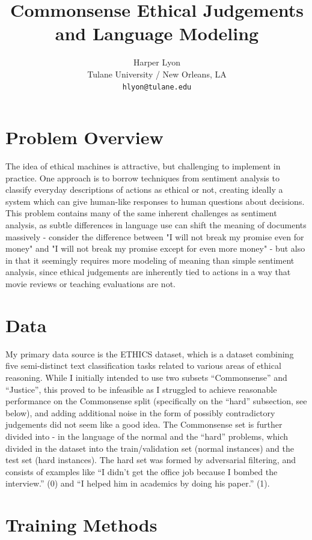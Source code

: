 \documentclass[11pt,a4paper]{article}
\title{Commonsense Ethical Judgements and Language Modeling}
\author{Harper Lyon \\
  Tulane University / New Orleans, LA \\
  \texttt{hlyon@tulane.edu}}
\date{}
\begin{document}
\maketitle

\section{Problem Overview}

The idea of ethical machines is attractive, but challenging to implement in practice. One approach is to borrow techniques from sentiment analysis \cite{hendrycks2023aligning} to classify everyday descriptions of actions as ethical or not, creating ideally a system which can give human-like responses to human questions about decisions. This problem contains many of the same inherent challenges as sentiment analysis, as subtle differences in language use can shift the meaning of documents massively - consider the difference between "I will not break my promise even for money" and "I will not break my promise except for even more money" - but also in that it seemingly requires more modeling of meaning than simple sentiment analysis, since ethical judgements are inherently tied to actions in a way that movie reviews or teaching evaluations are not. 

\section{Data}

My primary data source is the ETHICS \cite{hendrycks2023aligning} dataset, which is a dataset combining five semi-distinct text classification tasks related to various areas of ethical reasoning. While I initially intended to use two subsets ``Commonsense'' and ``Justice'', this proved to be infeasible as I struggled to achieve reasonable performance on the Commonsense split (specifically on the ``hard'' subsection, see below), and adding additional noise in the form of possibly contradictory judgements did not seem like a good idea. The Commonsense set is further divided into - in the language of \citeauthor{hendrycks2023aligning} the normal and the ``hard'' problems, which divided in the dataset into the train/validation set
(normal instances) and the test set (hard instances). The hard set was formed by adversarial filtering, and consists of examples like ``I didn't get the office job because I bombed the interview.'' (0) and ``I helped him in academics by doing his paper.'' (1).


\section{Training Methods}
\end{document}
